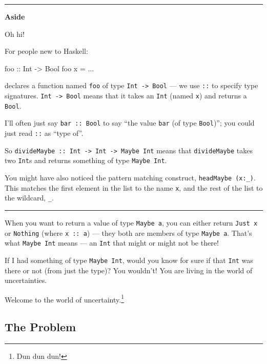 \documentclass[]{article}
\newenvironment{Shaded}{}{}
\newcommand{\DataTypeTok}[1]{\textcolor[rgb]{0.56,0.13,0.00}{#1}}
\newcommand{\NormalTok}[1]{#1}
\newcommand{\OperatorTok}[1]{\textcolor[rgb]{0.40,0.40,0.40}{#1}}
\newcommand{\OtherTok}[1]{\textcolor[rgb]{0.00,0.44,0.13}{#1}}
\begin{document}
\begin{center}\rule{0.5\linewidth}{0.5pt}\end{center}

\textbf{Aside}

Oh hi!

For people new to Haskell:

\begin{Shaded}
\begin{Highlighting}[]
\OtherTok{foo ::} \DataTypeTok{Int} \OtherTok{{-}\textgreater{}} \DataTypeTok{Bool}
\NormalTok{foo x }\OtherTok{=} \OperatorTok{...}
\end{Highlighting}
\end{Shaded}

declares a function named \texttt{foo} of type
\texttt{Int\ -\textgreater{}\ Bool} --- we use \texttt{::} to specify type
signatures. \texttt{Int\ -\textgreater{}\ Bool} means that it takes an
\texttt{Int} (named \texttt{x}) and returns a \texttt{Bool}.

I'll often just say \texttt{bar\ ::\ Bool} to say ``the value \texttt{bar} (of
type \texttt{Bool})''; you could just read \texttt{::} as ``type of''.

So
\texttt{divideMaybe\ ::\ Int\ -\textgreater{}\ Int\ -\textgreater{}\ Maybe\ Int}
means that \texttt{divideMaybe} takes two \texttt{Int}s and returns something of
type \texttt{Maybe\ Int}.

You might have also noticed the pattern matching construct,
\texttt{headMaybe\ (x:\_)}. This matches the first element in the list to the
name \texttt{x}, and the rest of the list to the wildcard, \texttt{\_}.

\begin{center}\rule{0.5\linewidth}{0.5pt}\end{center}

When you want to return a value of type \texttt{Maybe\ a}, you can either return
\texttt{Just\ x} or \texttt{Nothing} (where \texttt{x\ ::\ a}) --- they both are
members of type \texttt{Maybe\ a}. That's what \texttt{Maybe\ Int} means --- an
\texttt{Int} that might or might not be there!

If I had something of type \texttt{Maybe\ Int}, would you know for sure if that
\texttt{Int} was there or not (from just the type)? You wouldn't! You are living
in the world of uncertainties.

Welcome to the world of uncertainty.\footnote{Dun dun dun!}

\subsection{The Problem}\label{the-problem}
\end{document}
